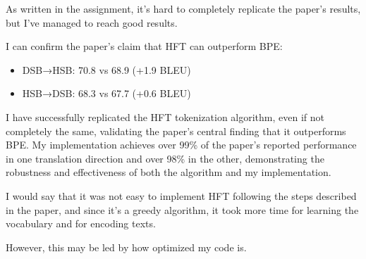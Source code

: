 \documentclass[12pt]{article}
\begin{document}
As written in the assignment, it's hard to completely replicate the paper's results, but I've managed to reach good results.

I can confirm the paper's claim that HFT can outperform BPE:
\begin{itemize}
    \item DSB→HSB: 70.8 vs 68.9 (+1.9 BLEU)
    \item HSB→DSB: 68.3 vs 67.7 (+0.6 BLEU)
\end{itemize}

I have successfully replicated the HFT tokenization algorithm, even if not completely the same, validating the paper's central finding that it outperforms BPE. My implementation achieves over 99\% of the paper's reported performance in one translation direction and over 98\% in the other, demonstrating the robustness and effectiveness of both the algorithm and my implementation.

I would say that it was not easy to implement HFT following the steps described in the paper, and since it's a greedy algorithm, it took more time for learning the vocabulary and for encoding texts. 

However, this may be led by how optimized my code is.
\end{document}
